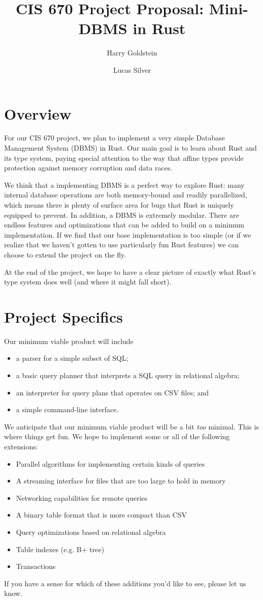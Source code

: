 \documentclass[acmsmall, nonacm, screen]{acmart}
\title{CIS 670 Project Proposal: Mini-DBMS in Rust}
\author{Harry Goldstein}
\author{Lucas Silver}
\begin{document}
\maketitle

\section{Overview}

For our CIS 670 project, we plan to implement a very simple Database Management System (DBMS) in
Rust. Our main goal is to learn about Rust and its type system, paying special
attention to the way that affine types provide protection against memory corruption and data
races.

We think that a implementing DBMS is a perfect way to explore Rust: many internal database
operations are both memory-bound and readily parallelized, which means there is plenty of surface
area for bugs that Rust is uniquely equipped to prevent. In addition, a DBMS is extremely
modular. There are endless features and optimizations that can be added to build on a minimum
implementation. If we find that our base implementation is too simple (or if we realize that we
haven't gotten to use particularly fun Rust features) we can choose to extend the project on the
fly.

At the end of the project, we hope to have a clear picture of exactly what Rust's type system does
well (and where it might fall short).

\section{Project Specifics}

Our minimum viable product will include
\begin{itemize}
  \item a parser for a simple subset of SQL;
  \item a basic query planner that interprets a SQL query in relational algebra;
  \item an interpreter for query plans that operates on CSV files; and
  \item a simple command-line interface.
\end{itemize}

We anticipate that our minimum viable product will be a bit {\em too} minimal. This is where
things get fun. We hope to implement some or all of the following extensions:
\begin{itemize}
  \item Parallel algorithms for implementing certain kinds of queries
  \item A streaming interface for files that are too large to hold in memory
  \item Networking capabilities for remote queries
  \item A binary table format that is more compact than CSV
  \item Query optimizations based on relational algebra
  \item Table indexes (e.g. B+ tree)
  \item Transactions
\end{itemize}
If you have a sense for which of these additions you'd like to see, please let us know.
\end{document}
